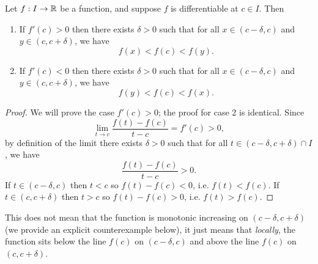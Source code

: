 \documentclass[../analysis1.tex]{subfiles}
\begin{document}
\begin{lemma}
\label{lem:localcomparison}
\begin{shaded*}
    Let $f:I\to\mathbb{R}$ be a function, and suppose $f$ is differentiable at $c\in I$. Then
    \begin{enumerate}
        \item[1.] If $f'(c)>0$ then there exists $\delta>0$ such that for all $x\in (c-\delta,c)$ and $y\in(c,c+\delta)$, we have \[f(x)<f(c)<f(y).\]
        \item[2.] If $f'(c)<0$ then there exists $\delta>0$ such that for all $x\in (c-\delta,c)$ and $y\in(c,c+\delta)$, we have \[f(y)<f(c)<f(x).\]
    \end{enumerate}
\end{shaded*}
\end{lemma}
\begin{proof}
    We will prove the case $f'(c)>0$; the proof for case 2 is identical. Since
    \[\lim_{t\to c}\frac{f(t)-f(c)}{t-c}=f'(c)>0,\]
    by definition of the limit there exists $\delta>0$ such that for all $t\in(c-\delta,c+\delta)\cap I$, we have
    \[\frac{f(t)-f(c)}{t-c}>0.\]
    If $t\in (c-\delta,c)$ then $t<c$ so $f(t)-f(c)<0$, i.e. $f(t)<f(c)$. If $t\in (c,c+\delta)$ then $t>c$ so $f(t)-f(c)>0$, i.e. $f(t)>f(c)$.\qedhere
\end{proof}
\begin{remark}
    This does not mean that the function is monotonic increasing on $(c-\delta,c+\delta)$ (we provide an explicit counterexample below), it just means that \textit{locally}, the function sits below the line $f(c)$ on $(c-\delta,c)$ and above the line $f(c)$ on $(c,c+\delta)$.
\end{remark}
\end{document}
